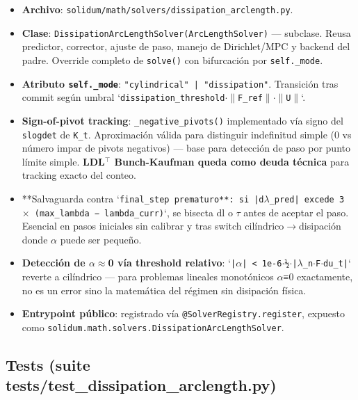 \documentclass[11pt,letterpaper,oneside]{report}
\begin{document}
\begin{itemize}
  \item \textbf{Archivo}: \texttt{solidum/math/solvers/dissipation\_arclength.py}.
  \item \textbf{Clase}: \texttt{DissipationArcLengthSolver(ArcLengthSolver)} --- subclase. Reusa predictor, corrector, ajuste de paso, manejo de Dirichlet/MPC y backend del padre. Override completo de \texttt{solve()} con bifurcación por \texttt{self.\_mode}.
  \item \textbf{Atributo \texttt{self.\_mode}}: \texttt{"cylindrical" | "dissipation"}. Transición tras commit según umbral `\texttt{dissipation\_threshold\ensuremath{\cdot}\ensuremath{\|}F\_ref\ensuremath{\|}\ensuremath{\cdot}\ensuremath{\|}U\ensuremath{\|}}`.
  \item \textbf{Sign-of-pivot tracking}: \texttt{\_negative\_pivots()} implementado vía signo del \texttt{slogdet} de \texttt{K\_t}. Aproximación válida para distinguir indefinitud simple (0 vs número impar de pivots negativos) --- base para detección de paso por punto límite simple. \textbf{LDL\ensuremath{^{\top}} Bunch-Kaufman queda como deuda técnica} para tracking exacto del conteo.
  \item **Salvaguarda contra `\texttt{final\_step}\texttt{ prematuro**: si }\texttt{|d\ensuremath{\lambda}\_pred|}\texttt{ excede }\texttt{3 \ensuremath{\times} (max\_lambda − lambda\_curr)}`, se bisecta dl o \ensuremath{\tau} antes de aceptar el paso. Esencial en pasos iniciales sin calibrar y tras switch cilíndrico\ensuremath{\to}disipación donde \ensuremath{\alpha} puede ser pequeño.
  \item \textbf{Detección de \ensuremath{\alpha}\ensuremath{\approx}0 vía threshold relativo}: `\texttt{|\ensuremath{\alpha}| < 1e-6\ensuremath{\cdot}½\ensuremath{\cdot}|\ensuremath{\lambda}\_n\ensuremath{\cdot}F\ensuremath{\cdot}du\_t|}` reverte a cilíndrico --- para problemas lineales monotónicos \ensuremath{\alpha}≡0 exactamente, no es un error sino la matemática del régimen sin disipación física.
  \item \textbf{Entrypoint público}: registrado vía \texttt{@SolverRegistry.register}, expuesto como \texttt{solidum.math.solvers.DissipationArcLengthSolver}.
\end{itemize}

\subsection{Tests (suite tests/test\_dissipation\_arclength.py)}
\end{document}
